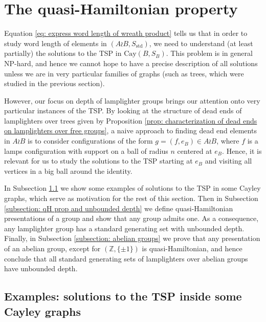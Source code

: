 \documentclass[reqno,oneside]{amsart}
\newcommand{\cay}[2]{\mathrm{Cay}(#1,#2)}
\newcommand{\Z}{\mathbb{Z}}
\newcommand{\std}{S_{\mathrm{std}}}
\theoremstyle{plain}
\theoremstyle{definition}
\begin{document}
\section{The quasi-Hamiltonian property}\label{section:quasi-hamiltonian property}
Equation \eqref{eq: express word length of wreath product} tells us that in order to study word length of elements in $(A\wr B,\std)$, we need to understand (at least partially) the solutions to the TSP in $\cay{B}{S_B}$. This problem is in general NP-hard, and hence we cannot hope to have a precise description of all solutions unless we are in very particular families of graphs (such as trees, which were studied in the previous section).

However, our focus on depth of lamplighter groups brings our attention onto very particular instances of the TSP. By looking at the structure of dead ends of lamplighters over trees given by Proposition \ref{prop: characterization of dead ends on lamplighters over free groups}, a naive approach to finding dead end elements in $A\wr B$ is to consider configurations of the form $g=(f,e_B)\in A\wr B$, where $f$ is a lamps configuration with support on a ball of radius $n$ centered at $e_B$. Hence, it is relevant for us to study the solutions to the TSP starting at $e_B$ and visiting all vertices in a big ball around the identity.

In Subsection \ref{subsection: qH motivation and examples} we show some examples of solutions to the TSP in some Cayley graphs, which serve as motivation for the rest of this section. Then in Subsection \ref{subsection: qH prop and unbounded depth} we define quasi-Hamiltonian presentations of a group and show that any group admits one. As a consequence, any lamplighter group has a standard generating set with unbounded depth. Finally, in Subsection \ref{subsection: abelian groups} we prove that any presentation of an abelian group, except for $(\Z,\{\pm 1\})$ is quasi-Hamiltonian, and hence conclude that all standard generating sets of lamplighters over abelian groups have unbounded depth.
\subsection{Examples: solutions to the TSP inside some Cayley graphs}\label{subsection: qH motivation and examples}
\end{document}
